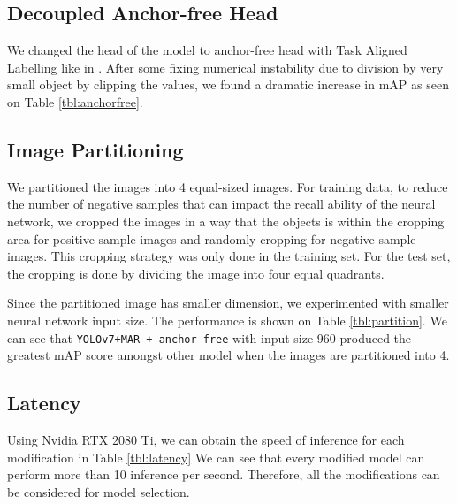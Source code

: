 \documentclass[conference]{IEEEtran}
\begin{document}
\subsection{Decoupled Anchor-free Head}
We changed the head of the model to anchor-free head with Task Aligned Labelling like in \cite{yolov6}.
After some fixing numerical instability due to division by very small object by clipping the values, we found a dramatic increase in mAP as seen on Table \ref{tbl:anchorfree}.
\begin{table}[htbp]
  \centering
  \label{tbl:anchorfree}
  \begin{adjustbox}{width=\linewidth}
  
  \end{adjustbox}
  
\end{table}
\subsection{Image Partitioning}
We partitioned the images into 4 equal-sized images.
For training data, to reduce the number of negative samples that can impact the recall ability of the neural network,
we cropped the images in a way that the objects is within the cropping area for positive sample images and randomly cropping for negative sample images.
This cropping strategy was only done in the training set. For the test set, the cropping is done by dividing the image into four equal quadrants.

Since the partitioned image has smaller dimension, we experimented with smaller neural network input size.
The performance is shown on Table \ref{tbl:partition}. We can see that \texttt{YOLOv7+MAR + anchor-free} with input size 960 produced the greatest mAP score amongst other model when the images are partitioned into 4.

\begin{table}[htbp]
  \centering
  \label{tbl:partition}
  
\end{table}

\subsection{Latency}
Using Nvidia RTX 2080 Ti, we can obtain the speed of inference for each modification in Table \ref{tbl:latency}
We can see that every modified model can perform more than 10 inference per second.
Therefore, all the modifications can be considered for model selection.
\end{document}
